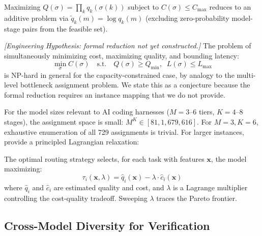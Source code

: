 \begin{proposition}
\label{prop:routing-multiplicative}
Maximizing $Q(\sigma) = \prod_k q_k(\sigma(k))$ subject to $C(\sigma) \leq C_{\max}$ reduces to an additive problem via $\tilde{q}_k(m) = \log q_k(m)$ (excluding zero-probability model-stage pairs from the feasible set).
\end{proposition}

\begin{conjecture}
\emph{[Engineering Hypothesis: formal reduction not yet constructed.]}
\label{conj:routing-hard}
The problem of simultaneously minimizing cost, maximizing quality, and bounding latency:
\begin{equation}
\min_{\sigma} C(\sigma) \quad \text{s.t.} \quad Q(\sigma) \geq Q_{\min}, \;\; L(\sigma) \leq L_{\max}
\end{equation}
is NP-hard in general for the capacity-constrained case, by analogy to the multi-level bottleneck assignment problem. We state this as a conjecture because the formal reduction requires an instance mapping that we do not provide.
\end{conjecture}

For the model sizes relevant to AI coding harnesses ($M = 3$--$6$ tiers, $K = 4$--$8$ stages), the assignment space is small: $M^K \in [81, 1{,}679{,}616]$. For $M = 3, K = 6$, exhaustive enumeration of all 729 assignments is trivial. For larger instances, \citet{dekoninck2025cascade} provide a principled Lagrangian relaxation:

\begin{proposition}
\label{prop:routing-lagrangian}
The optimal routing strategy selects, for each task with features $\mathbf{x}$, the model maximizing:
\begin{equation}
\tau_i(\mathbf{x}, \lambda) = \hat{q}_i(\mathbf{x}) - \lambda \cdot \hat{c}_i(\mathbf{x})
\end{equation}
where $\hat{q}_i$ and $\hat{c}_i$ are estimated quality and cost, and $\lambda$ is a Lagrange multiplier controlling the cost-quality tradeoff. Sweeping $\lambda$ traces the Pareto frontier.
\end{proposition}

\subsection{Cross-Model Diversity for Verification}

